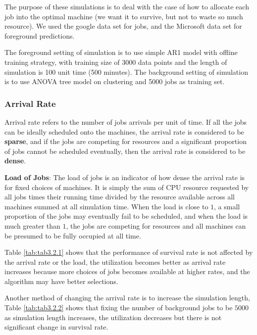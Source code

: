 \documentclass{article}
\begin{document}
\begin{flushleft}
The purpose of these simulations is to deal with the case of how to allocate each job into the optimal machine (we want it to survive, but not to waste so much resource). We used the google data set for jobs, and the Microsoft data set for foreground predictions.
\end{flushleft}

\begin{flushleft}
The foreground setting of simulation is to use simple AR1 model with offline training strategy, with training size of 3000 data points and the length of simulation is 100 unit time (500 minutes). The background setting of simulation is to use ANOVA tree model on clustering and 5000 jobs as training set.
\end{flushleft}

\subsubsection{Arrival Rate}

\begin{flushleft}
Arrival rate refers to the number of jobs arrivals per unit of time. If all the jobs can be ideally scheduled onto the machines, the arrival rate is considered to be \textbf{sparse}, and if the jobs are competing for resources and a significant proportion of jobs cannot be scheduled eventually, then the arrival rate is considered to be \textbf{dense}.

\textbf{Load of Jobs}: The load of jobs is an indicator of how dense the arrival rate is for fixed choices of machines. It is simply the sum of CPU resource requested by all jobs times their running time divided by the resource available across all machines summed at all simulation time. When the load is close to $1$, a small proportion of the jobs may eventually fail to be scheduled, and when the load is much greater than $1$, the jobs are competing for resources and all machines can be presumed to be fully occupied at all time.

Table \ref{tab:tab3.2.1} shows that the performance of survival rate is not affected by the arrival rate or the load, the utilization becomes better as arrival rate increases because more choices of jobs becomes available at higher rates, and the algorithm may have better selections.

Another method of changing the arrival rate is to increase the simulation length, Table \ref{tab:tab3.2.2} shows that fixing the number of background jobs to be $5000$ as simulation length increases, the utilization decreases but there is not significant change in survival rate.
\end{flushleft}
\end{document}
